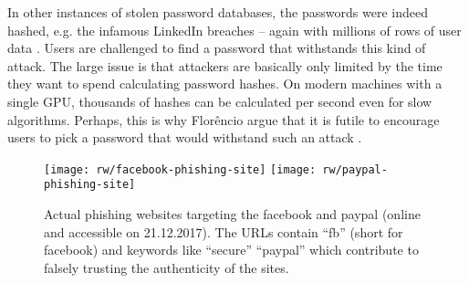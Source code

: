In other instances of stolen password databases, the passwords were indeed hashed, e.g. the infamous LinkedIn breaches -- again with millions of rows of user data \cite{Huh2017TooBusy}. 
Users are challenged to find a password that withstands this kind of attack. The large issue is that attackers are basically only limited by the time they want to spend calculating password hashes. On modern machines with a single GPU, thousands of hashes can be calculated per second even for slow algorithms. Perhaps, this is why Florêncio \etal argue that it is futile to encourage users to pick a password that would withstand such an attack \cite{Florencio2014AdministratorsGuide, Florencio2016CommACM}. 

\begin{figure}[h!]
	\centering
	\texttt{[image: rw/facebook-phishing-site]}
	\texttt{[image: rw/paypal-phishing-site]}
	\caption{\label{fig:rw:phishingsite} Actual phishing websites targeting the facebook and paypal (online and accessible on 21.12.2017). The URLs contain ``fb'' (short for facebook) and keywords like ``secure'' ``paypal'' which contribute to falsely trusting the authenticity of the sites.}
\end{figure}

